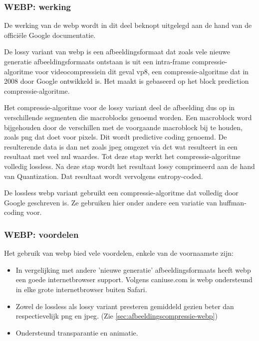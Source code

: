 \subsubsection{WEBP: werking}
\label{sec:afbeeldingscompressie-webp-werking}

De werking van de \gls{webp} wordt in dit deel beknopt uitgelegd aan de hand van de officiële Google documentatie. 

De \gls{lossy} variant van \gls{webp} is een \gls{afbeeldingsformaat} dat zoals vele nieuwe generatie \glspl{afbeeldingsformaat} ontstaan is uit een \gls{intra-frame} \gls{compressie-algoritme} voor \gls{videocompressie}in dit geval \gls{vp8}, een \gls{compressie-algoritme} dat in 2008 door Google ontwikkeld is. Het maakt is gebaseerd op het block prediction \gls{compressie-algoritme}.

Het \gls{compressie-algoritme} voor de \gls{lossy} variant deel de afbeelding dus op in verschillende segmenten die macroblocks genoemd worden. Een macroblock word bijgehouden door de verschillen met de voorgaande macroblock bij te houden, zoals \gls{png} dat doet voor pixels. Dit wordt predictive coding genoemd. De resulterende data is dan net zoals \gls{jpeg} omgezet via \gls{dct} wat resulteert in een resultaat met veel nul waardes. Tot deze stap werkt het \gls{compressie-algoritme} volledig \gls{lossless}. Na deze stap wordt het resultaat \gls{lossy} comprimeerd aan de hand van Quantization. Dat resultaat wordt vervolgens entropy-coded.

De \gls{lossless} \gls{webp} variant gebruikt een \gls{compressie-algoritme} dat volledig door Google geschreven is. Ze gebruiken hier onder andere een variatie van \gls{huffman-coding} voor.

\subsubsection{WEBP: voordelen}
\label{sec:afbeeldingscompressie-webp-voordelen}

Het gebruik van \gls{webp} bied vele voordelen, enkele van de voornaamste zijn:

\begin{itemize}
	\item In vergelijking met andere 'nieuwe generatie' \glspl{afbeeldingsformaat} heeft \gls{webp} een goede internetbrowser support. Volgens caniuse.com is \gls{webp} ondersteund in elke grote internetbrowser buiten Safari.
	
	\item Zowel de \gls{lossless} als \gls{lossy} variant presteren gemiddeld gezien beter dan respectievelijk \gls{png} en \gls{jpeg}. (Zie \ref{sec:afbeeldingscompressie-webp})
	
	\item Ondersteund transparantie en animatie.
\end{itemize}

